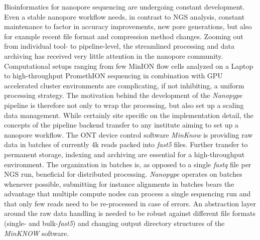 Bioinformatics for nanopore sequencing are undergoing constant development.
Even a stable nanopore workflow needs, in contrast to NGS analysis, constant maintenance to factor in accuracy improvements, new pore generations, but also for example recent file format and compression method changes.
Zooming out from individual tool- to pipeline-level, the streamlined processing and data archiving has received very little attention in the nanopore community.
Computational setups ranging from few MinION flow cells analyzed on a Laptop to high-throughput PromethION sequencing in combination with GPU accelerated cluster environments are complicating, if not inhibiting, a uniform processing strategy.
The motivation behind the development of the \textit{Nanopype} pipeline is therefore not only to wrap the processing, but also set up a scaling data management.
While certainly site specific on the implementation detail, the concepts of the pipeline backend transfer to any institute aiming to set up a nanopore workflow.
The ONT device control software \textit{MinKnow} is providing raw data in batches of currently 4k reads packed into \textit{fast5} files.
Further transfer to permanent storage, indexing and archiving are essential for a high-throughput environment.
The organization in batches is, as opposed to a single \textit{fastq} file per NGS run, beneficial for distributed processing.
\textit{Nanopype} operates on batches whenever possible, submitting for instance alignments in batches bears the advantage that multiple compute nodes can process a single sequencing run and that only few reads need to be re-processed in case of errors.
An abstraction layer around the raw data handling is needed to be robust against different file formats (single- and bulk-\textit{fast5}) and changing output directory structures of the \textit{MinKNOW} software.

